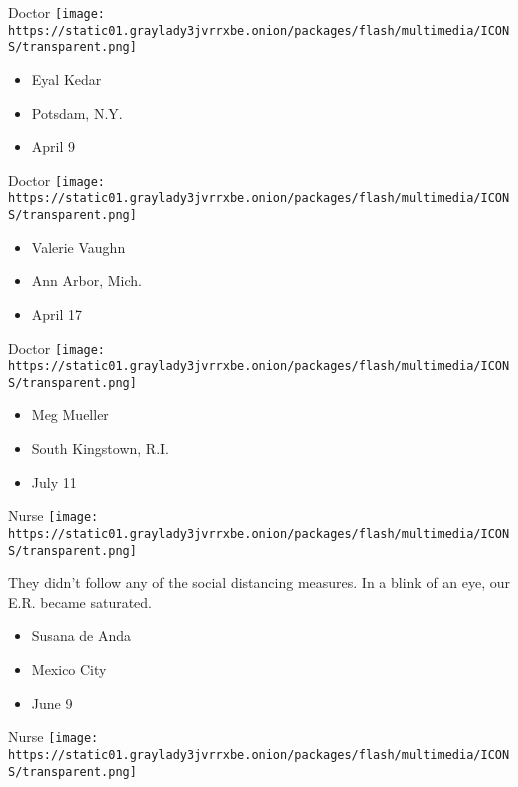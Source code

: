 \protect\hyperlink{item-eyal-kedar}{}

Doctor
\texttt{[image: https://static01.graylady3jvrrxbe.onion/packages/flash/multimedia/ICONS/transparent.png]}

\begin{itemize}
\tightlist
\item
  Eyal Kedar
\item
  Potsdam, N.Y.
\item
  April 9
\end{itemize}

\protect\hyperlink{item-valerie-vaughn}{}

Doctor
\texttt{[image: https://static01.graylady3jvrrxbe.onion/packages/flash/multimedia/ICONS/transparent.png]}

\begin{itemize}
\tightlist
\item
  Valerie Vaughn
\item
  Ann Arbor, Mich.
\item
  April 17
\end{itemize}

\protect\hyperlink{item-meg-mueller}{}

Doctor
\texttt{[image: https://static01.graylady3jvrrxbe.onion/packages/flash/multimedia/ICONS/transparent.png]}

\begin{itemize}
\tightlist
\item
  Meg Mueller
\item
  South Kingstown, R.I.
\item
  July 11
\end{itemize}

\protect\hyperlink{item-susana-de-anda}{}

Nurse
\texttt{[image: https://static01.graylady3jvrrxbe.onion/packages/flash/multimedia/ICONS/transparent.png]}

They didn't follow any of the social distancing measures. In a blink of
an eye, our E.R. became saturated.

\begin{itemize}
\tightlist
\item
  Susana de Anda
\item
  Mexico City
\item
  June 9
\end{itemize}

\protect\hyperlink{item-amanda-ramalho}{}

Nurse
\texttt{[image: https://static01.graylady3jvrrxbe.onion/packages/flash/multimedia/ICONS/transparent.png]}

